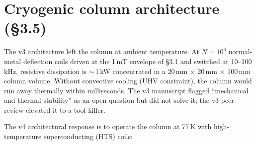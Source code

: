 \documentclass[11pt,letterpaper]{article}
\begin{document}
\clearpage
\section{Cryogenic column architecture (\S 3.5)}

The v3 architecture left the column at ambient temperature. At $N=10^6$ normal-metal deflection coils driven at the 1\,mT envelope of \S 3.1 and switched at 10--100\,kHz, resistive dissipation is $\sim$\,1\,kW concentrated in a 20\,mm $\times$ 20\,mm $\times$ 100\,mm column volume. Without convective cooling (UHV constraint), the column would run away thermally within milliseconds. The v3 manuscript flagged ``mechanical and thermal stability'' as an open question but did not solve it; the v3 peer review elevated it to a tool-killer.

The v4 architectural response is to operate the column at 77\,K with high-temperature superconducting (HTS) coils:
\end{document}

